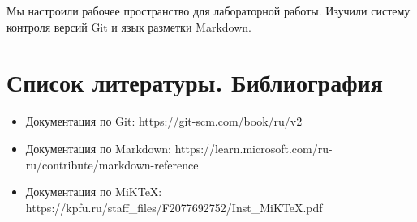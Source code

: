 \documentclass[
  12pt,
  a4paper,
]{scrreprt}
\begin{document}
Мы настроили рабочее пространство для лабораторной работы. Изучили
систему контроля версий Git и язык разметки Markdown.

\hypertarget{ux441ux43fux438ux441ux43eux43a-ux43bux438ux442ux435ux440ux430ux442ux443ux440ux44b.-ux431ux438ux431ux43bux438ux43eux433ux440ux430ux444ux438ux44f}{%
\chapter{Список литературы.
Библиография}\label{ux441ux43fux438ux441ux43eux43a-ux43bux438ux442ux435ux440ux430ux442ux443ux440ux44b.-ux431ux438ux431ux43bux438ux43eux433ux440ux430ux444ux438ux44f}}

\begin{itemize}
\item
  Документация по Git: https://git-scm.com/book/ru/v2
\item
  Документация по Markdown:
  https://learn.microsoft.com/ru-ru/contribute/markdown-reference
\item
  Документация по MiKTeX:
  https://kpfu.ru/staff\_files/F2077692752/Inst\_MiKTeX.pdf
\end{itemize}

\printbibliography
\end{document}
